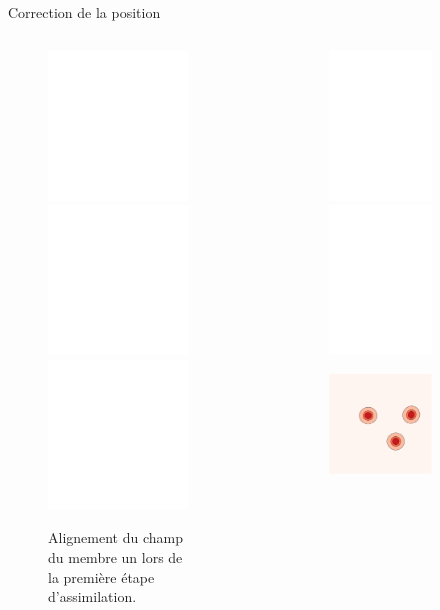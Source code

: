 \documentclass[aspectratio=169]{beamer} %
\begin{document}
\begin{frame}{Correction de la position}
    \vspace{-0.5cm}
    \begin{columns}[c]
        \begin{column}{0.45\textwidth}
            \begin{figure}
                \centering
                \caption*{\tiny Alignement du champ du membre un lors de la première étape d'assimilation.}
                \includegraphics<1>[width=\textwidth]{../../conference/images/align_member/align_member_prior.pdf}
                \includegraphics<2>[width=\textwidth]{../../conference/images/align_member/align_member_prior_field.pdf}
                \includegraphics<3->[width=\textwidth]{../../conference/images/align_member/align_member_final.pdf}
            \end{figure}
        \end{column}
        \begin{column}{0.55\textwidth}
            \begin{figure}[c]
                \centering
                \caption*{\tiny Correction du champ de vorticité lors de la première étape d'assimilation.}
                \begin{subfigure}{0.49\textwidth}
                    \centering
                    \includegraphics<1-2>[width=\textwidth]{../../conference/images/vorticity_prior.pdf}
                    \includegraphics<3>[width=\textwidth]{../../conference/images/vorticity_align.pdf}
                \end{subfigure}
                \begin{subfigure}{0.49\textwidth}
                    \centering
                    \includegraphics[width=\textwidth]{../../conference/images/vorticity_ref.pdf}

\end{subfigure}
\end{figure}
\end{column}
\end{columns}
\end{frame}
\end{document}
